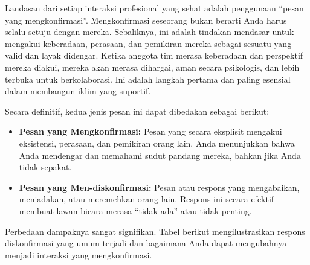 \documentclass[
  letterpaper,
  DIV=11,
  numbers=noendperiod]{scrreprt}
\begin{document}
Landasan dari setiap interaksi profesional yang sehat adalah penggunaan
``pesan yang mengkonfirmasi''. Mengkonfirmasi seseorang bukan berarti
Anda harus selalu setuju dengan mereka. Sebaliknya, ini adalah tindakan
mendasar untuk mengakui keberadaan, perasaan, dan pemikiran mereka
sebagai sesuatu yang valid dan layak didengar. Ketika anggota tim merasa
keberadaan dan perspektif mereka diakui, mereka akan merasa dihargai,
aman secara psikologis, dan lebih terbuka untuk berkolaborasi. Ini
adalah langkah pertama dan paling esensial dalam membangun iklim yang
suportif.

Secara definitif, kedua jenis pesan ini dapat dibedakan sebagai berikut:

\begin{itemize}
\item
  \textbf{Pesan yang Mengkonfirmasi:} Pesan yang secara eksplisit
  mengakui eksistensi, perasaan, dan pemikiran orang lain. Anda
  menunjukkan bahwa Anda mendengar dan memahami sudut pandang mereka,
  bahkan jika Anda tidak sepakat.
\item
  \textbf{Pesan yang Men-diskonfirmasi:} Pesan atau respons yang
  mengabaikan, meniadakan, atau meremehkan orang lain. Respons ini
  secara efektif membuat lawan bicara merasa ``tidak ada'' atau tidak
  penting.
\end{itemize}

Perbedaan dampaknya sangat signifikan. Tabel berikut mengilustrasikan
respons diskonfirmasi yang umum terjadi dan bagaimana Anda dapat
mengubahnya menjadi interaksi yang mengkonfirmasi.
\end{document}
